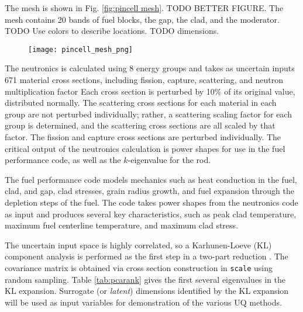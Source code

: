 The mesh is shown in Fig. \ref{fig:pincell mesh}.  TODO BETTER FIGURE.  The mesh contains 20 bands of fuel
blocks, the gap, the clad, and the moderator.  TODO Use colors to describe locations.  TODO dimensions.
\begin{figure}[htb]
  \centering
  \texttt{[image: pincell\_mesh\_png]}
\end{figure}

The neutronics is calculated using 8 energy groups and takes as uncertain inputs 671 material cross
sections, including fission, capture, scattering, and neutron multiplication factor  Each cross section is
perturbed by 10\% of its original value, distributed normally.  The scattering cross
sections for each material in each group are not perturbed individually; rather, a scattering scaling factor
for each group is determined, and the scattering cross sections are all scaled by that factor.  The fission
and capture cross sections are perturbed individually.  The critical output of the neutronics calculation is
power shapes for use in the fuel performance code, as well as the $k$-eigenvalue for the rod.

The fuel performance code models mechanics such as heat conduction in the fuel, clad, and gap, clad stresses, grain radius
growth, and fuel expansion through the depletion steps of the fuel. The code takes power shapes
from the neutronics code as input and produces several key characteristics, such as peak clad temperature, maximum
fuel centerline temperature, and maximum clad stress.

The uncertain input space is highly correlated, so a Karhunen-Loeve (KL) component analysis is performed as
the first step in a two-part reduction \cite{physor2016}. The
covariance matrix is obtained via cross section construction in \texttt{scale}\cite{scale} using random sampling.  
Table \ref{tab:pcarank} gives the first several eigenvalues in the KL expansion.  Surrogate (or
\emph{latent}) dimensions identified by the KL expansion will be used as input variables for demonstration of
the various UQ methods.

